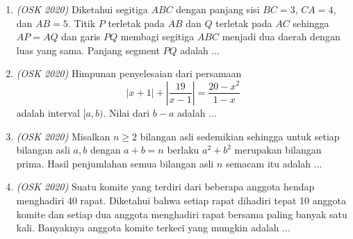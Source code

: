 \documentclass[11pt]{scrartcl}
\begin{document}
\begin{enumerate}
    \item \textit{(OSK 2020)} Diketahui segitiga $ABC$ dengan panjang sisi $BC=3$, $CA=4$, dan $AB=5$. Titik $P$ terletak pada $AB$ dan $Q$ terletak pada $AC$ sehingga $AP=AQ$ dan garis $PQ$ membagi segitiga $ABC$ menjadi dua daerah dengan luas yang sama. Panjang segment $PQ$ adalah $\dots$
    
    \item \textit{(OSK 2020)} Himpunan penyelesaian dari persamaan $$|x+1|+\left|\dfrac{19}{x-1}\right|=\dfrac{20-x^2}{1-x}$$ adalah interval $[a,b)$. Nilai dari $b-a$ adalah $\dots$
    
    \item \textit{(OSK 2020)} Misalkan $n \geq 2$ bilangan asli sedemikian sehingga untuk setiap bilangan asli $a,b$ dengan  $a+b = n$ berlaku $a^2+b^2$ merupakan bilangan prima. Hasil penjumlahan semua bilangan asli $n$ semacam itu adalah $\dots$
    
    \item \textit{(OSK 2020)} Suatu komite yang terdiri dari beberapa anggota hendap menghadiri 40 rapat. Diketahui bahwa setiap rapat dihadiri tepat 10 anggota komite dan setiap dua anggota menghadiri rapat bersama paling banyak satu kali. Banyaknya anggota komite terkeci yang mungkin adalah $\dots$
\end{enumerate}
\end{document}
